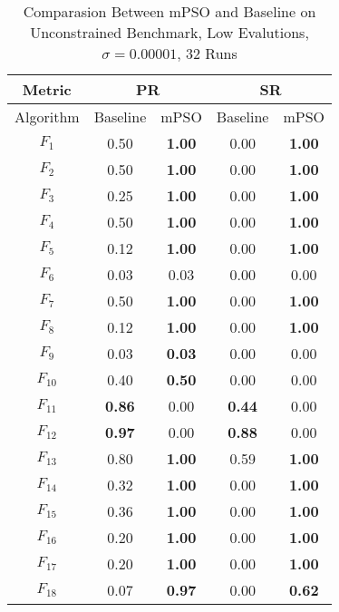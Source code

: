 \begin{table}[h]
  \centering
  \caption{Comparasion Between mPSO and Baseline on Unconstrained Benchmark, Low Evalutions, $\sigma=0.00001$, 32 Runs}
  \begin{tabular}{|c|c|c|c|c|}
    \hline
    Metric & \multicolumn{2}{c|}{PR} & \multicolumn{2}{c|}{SR} \\
    \hline
    Algorithm & Baseline & mPSO & Baseline & mPSO \\
    \hline
    $F_{1}$ & 0.50 & \textbf{1.00} & 0.00 & \textbf{1.00}\\
    \hline
    $F_{2}$ & 0.50 & \textbf{1.00} & 0.00 & \textbf{1.00}\\
    \hline
    $F_{3}$ & 0.25 & \textbf{1.00} & 0.00 & \textbf{1.00}\\
    \hline
    $F_{4}$ & 0.50 & \textbf{1.00} & 0.00 & \textbf{1.00}\\
    \hline
    $F_{5}$ & 0.12 & \textbf{1.00} & 0.00 & \textbf{1.00}\\
    \hline
    $F_{6}$ & 0.03 & 0.03 & 0.00 & 0.00\\
    \hline
    $F_{7}$ & 0.50 & \textbf{1.00} & 0.00 & \textbf{1.00}\\
    \hline
    $F_{8}$ & 0.12 & \textbf{1.00} & 0.00 & \textbf{1.00}\\
    \hline
    $F_{9}$ & 0.03 & \textbf{0.03} & 0.00 & 0.00\\
    \hline
    $F_{10}$ & 0.40 & \textbf{0.50} & 0.00 & 0.00\\
    \hline
    $F_{11}$ & \textbf{0.86} & 0.00 & \textbf{0.44} & 0.00\\
    \hline
    $F_{12}$ & \textbf{0.97} & 0.00 & \textbf{0.88} & 0.00\\
    \hline
    $F_{13}$ & 0.80 & \textbf{1.00} & 0.59 & \textbf{1.00}\\
    \hline
    $F_{14}$ & 0.32 & \textbf{1.00} & 0.00 & \textbf{1.00}\\
    \hline
    $F_{15}$ & 0.36 & \textbf{1.00} & 0.00 & \textbf{1.00}\\
    \hline
    $F_{16}$ & 0.20 & \textbf{1.00} & 0.00 & \textbf{1.00}\\
    \hline
    $F_{17}$ & 0.20 & \textbf{1.00} & 0.00 & \textbf{1.00}\\
    \hline
    $F_{18}$ & 0.07 & \textbf{0.97} & 0.00 & \textbf{0.62}\\
    \hline
  \end{tabular}
\end{table}